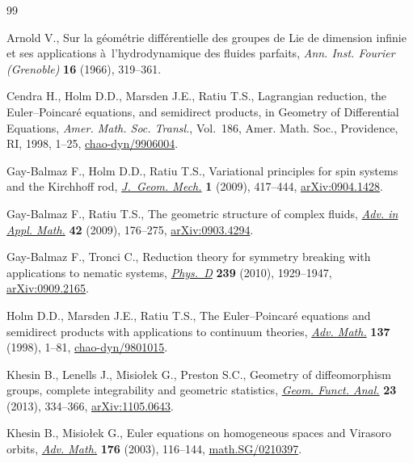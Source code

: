 \begin{thebibliography}{99}
\footnotesize \itemsep=-0.5pt

Arnold V., Sur la g\'eom\'etrie dif\/f\'erentielle des groupes de {L}ie de
  dimension inf\/inie et ses applications \`a~l'hydrodynamique des f\/luides
  parfaits, \textit{Ann. Inst. Fourier (Grenoble)} \textbf{16} (1966),
  319--361.

Cendra H., Holm D.D., Marsden J.E., Ratiu T.S., Lagrangian reduction, the
  {E}uler--{P}oincar\'e equations, and semidirect products, in Geometry of
  Dif\/ferential Equations, \textit{Amer. Math. Soc. Transl.}, Vol.~186, Amer.
  Math. Soc., Providence, RI, 1998, 1--25, \href{http://arxiv.org/abs/chao-dyn/9906004}{chao-dyn/9906004}.

Gay-Balmaz F., Holm D.D., Ratiu T.S., Variational principles for spin systems
  and the {K}irchhof\/f rod, \href{http://dx.doi.org/10.3934/jgm.2009.1.417}{\textit{J.~Geom. Mech.}} \textbf{1} (2009), 417--444,
  \href{http://arxiv.org/abs/0904.1428}{arXiv:0904.1428}.

Gay-Balmaz F., Ratiu T.S., The geometric structure of complex f\/luids,
  \href{http://dx.doi.org/10.1016/j.aam.2008.06.002}{\textit{Adv. in Appl. Math.}} \textbf{42} (2009), 176--275,
  \href{http://arxiv.org/abs/0903.4294}{arXiv:0903.4294}.

Gay-Balmaz F., Tronci C., Reduction theory for symmetry breaking with
  applications to nematic systems, \href{http://dx.doi.org/10.1016/j.physd.2010.07.002}{\textit{Phys.~D}} \textbf{239} (2010),
  1929--1947, \href{http://arxiv.org/abs/0909.2165}{arXiv:0909.2165}.

Holm D.D., Marsden J.E., Ratiu T.S., The {E}uler--{P}oincar\'e equations and
  semidirect products with applications to continuum theories, \href{http://dx.doi.org/10.1006/aima.1998.1721}{\textit{Adv.
  Math.}} \textbf{137} (1998), 1--81, \href{http://arxiv.org/abs/chao-dyn/9801015}{chao-dyn/9801015}.

Khesin B., Lenells J., Misio{\l}ek G., Preston S.C., Geometry of dif\/feomorphism
  groups, complete integrability and geometric statistics, \href{http://dx.doi.org/10.1007/s00039-013-0210-2}{\textit{Geom. Funct.
  Anal.}} \textbf{23} (2013), 334--366, \href{http://arxiv.org/abs/1105.0643}{arXiv:1105.0643}.

Khesin B., Misio{\l}ek G., Euler equations on homogeneous spaces and {V}irasoro
  orbits, \href{http://dx.doi.org/10.1016/S0001-8708(02)00063-4}{\textit{Adv. Math.}} \textbf{176} (2003), 116--144,
  \href{http://arxiv.org/abs/math.SG/0210397}{math.SG/0210397}.


\end{thebibliography}
